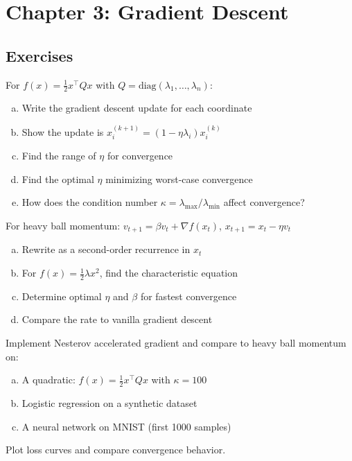 \documentclass[../main.tex]{subfiles}
\begin{document}
\section{Chapter 3: Gradient Descent}\label{sec:ex-gradient-descent}

\subsection{Exercises}

\begin{simpleexercise}
For $f(x) = \frac{1}{2}x^\top Qx$ with $Q = \text{diag}(\lambda_1, \ldots, \lambda_n)$:
\begin{enumerate}[(a)]
    \item Write the gradient descent update for each coordinate
    \item Show the update is $x_i^{(k+1)} = (1 - \eta\lambda_i)x_i^{(k)}$
    \item Find the range of $\eta$ for convergence
    \item Find the optimal $\eta$ minimizing worst-case convergence
    \item How does the condition number $\kappa = \lambda_{\max}/\lambda_{\min}$ affect convergence?
\end{enumerate}
\end{simpleexercise}

\begin{simpleexercise}[Momentum]
For heavy ball momentum: $v_{t+1} = \beta v_t + \nabla f(x_t)$, $x_{t+1} = x_t - \eta v_t$
\begin{enumerate}[(a)]
    \item Rewrite as a second-order recurrence in $x_t$
    \item For $f(x) = \frac{1}{2}\lambda x^2$, find the characteristic equation
    \item Determine optimal $\eta$ and $\beta$ for fastest convergence
    \item Compare the rate to vanilla gradient descent
\end{enumerate}
\end{simpleexercise}

\begin{simpleexercise}
Implement Nesterov accelerated gradient and compare to heavy ball momentum on:
\begin{enumerate}[(a)]
    \item A quadratic: $f(x) = \frac{1}{2}x^\top Q x$ with $\kappa = 100$
    \item Logistic regression on a synthetic dataset
    \item A neural network on MNIST (first 1000 samples)
\end{enumerate}
Plot loss curves and compare convergence behavior.
\end{simpleexercise}
\end{document}
